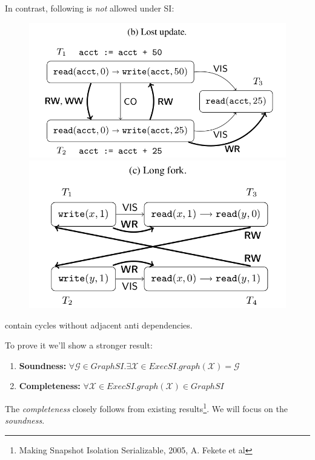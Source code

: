 \documentclass{beamer}
\begin{document}
\begin{frame}
In contrast, following is \emph{not} allowed under SI:
\begin{figure}
\includegraphics[scale=0.2]{fig2b}
\includegraphics[scale=0.2]{fig2c}
\end{figure}
contain cycles without adjacent anti dependencies.
\end{frame}

\begin{frame}
	To prove it we'll show a stronger result: \\
	\begin{enumerate}
		\item \textbf{Soundness:} $ \forall \mathcal{G} \in GraphSI. \exists \mathcal{X} \in ExecSI. graph(\mathcal{X}) = \mathcal{G} $ 
		\item \textbf{Completeness:} $ \forall \mathcal{X} \in ExecSI. graph(\mathcal{X}) \in GraphSI$
	\end{enumerate}
	The \textit{completeness} closely follows from existing results\footnote{Making Snapshot Isolation Serializable, 2005, A. Fekete et al}. We will focus on the \textit{soundness}.
	
\end{frame}
\end{document}
